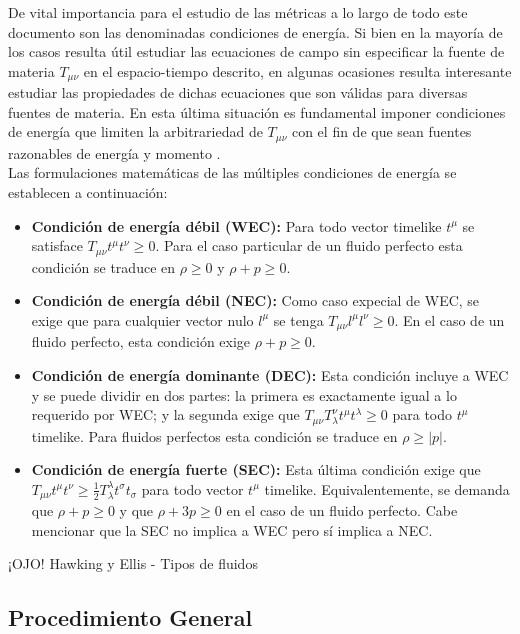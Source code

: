 \documentclass{article}
\numberwithin{equation}{section}
\begin{document}
De vital importancia para el estudio de las métricas a lo largo de todo este documento son las denominadas condiciones de energía. Si bien en la mayoría de los casos resulta útil estudiar las ecuaciones de campo sin especificar la fuente de materia $T_{\mu \nu}$ en el espacio-tiempo descrito, en algunas ocasiones resulta interesante estudiar las propiedades de dichas ecuaciones que son válidas para diversas fuentes de materia. En esta última situación es fundamental imponer condiciones de energía que limiten la arbitrariedad de $T_{\mu \nu}$ con el fin de que sean fuentes razonables de energía y momento \cite{carroll}.\\

Las formulaciones matemáticas de las múltiples  condiciones de energía se establecen a continuación:

\begin{itemize}
\item \textbf{Condición de energía débil (WEC):} Para todo vector timelike $t^\mu$ se satisface $T_{\mu \nu}t^{\mu}t^{\nu} \geq 0$. Para el caso particular de un fluido perfecto esta condición se traduce en $\rho \geq 0$ y $\rho + p \geq 0$.

\item \textbf{Condición de energía débil (NEC):} Como caso expecial de WEC, se exige que para cualquier vector nulo $l^\mu$ se tenga $T_{\mu \nu}l^{\mu}l^{\nu} \geq 0$. En el caso de un fluido perfecto, esta condición exige $\rho + p \geq 0$.

\item \textbf{Condición de energía dominante (DEC):} Esta condición incluye a WEC y se puede dividir en dos partes: la primera es exactamente igual a lo requerido por WEC; y la segunda exige que $T_{\mu \nu}T^{\nu}_{\lambda}t^{\mu}t^{\lambda} \geq 0$ para todo $t^{\mu}$ timelike. Para fluidos perfectos esta condición se traduce en $\rho \geq |p|$.

\item \textbf{Condición de energía fuerte (SEC):} Esta última condición exige que $T_{\mu \nu}t^{\mu}t^{\nu} \geq \frac{1}{2}T^{\lambda}_{\lambda}t^{\sigma}t_{\sigma}$ para todo vector $t^\mu$ timelike. Equivalentemente, se demanda que $\rho + p \geq 0$ y que $\rho + 3p \geq 0$ en el caso de un fluido perfecto. Cabe mencionar que la SEC no implica a WEC pero sí implica a NEC.
\end{itemize}

¡OJO! Hawking y Ellis - Tipos de fluidos

\subsection{Procedimiento General}
\end{document}
